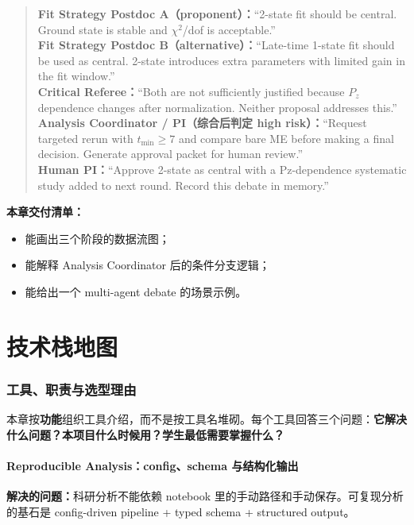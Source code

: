 \documentclass[11pt,a4paper,fontset=fandol]{ctexart}
\begin{document}
\begin{quote}
\textbf{Fit Strategy Postdoc A（proponent）：}``2-state fit should be central. Ground state is stable and $\chi^2$/dof is acceptable.''\\
\textbf{Fit Strategy Postdoc B（alternative）：}``Late-time 1-state fit should be used as central. 2-state introduces extra parameters with limited gain in the fit window.''\\
\textbf{Critical Referee：}``Both are not sufficiently justified because $P_z$ dependence changes after normalization. Neither proposal addresses this.''\\
\textbf{Analysis Coordinator / PI（综合后判定 high risk）：}``Request targeted rerun with $t_{\min}\ge 7$ and compare bare ME before making a final decision. Generate approval packet for human review.''\\
\textbf{Human PI：}``Approve 2-state as central with a Pz-dependence systematic study added to next round. Record this debate in memory.''
\end{quote}

\textbf{本章交付清单：}
\begin{itemize}
  \item 能画出三个阶段的数据流图；
  \item 能解释 Analysis Coordinator 后的条件分支逻辑；
  \item 能给出一个 multi-agent debate 的场景示例。
\end{itemize}

\newpage
\part{技术栈地图}

\section{工具、职责与选型理由}

本章按\textbf{功能}组织工具介绍，而不是按工具名堆砌。每个工具回答三个问题：\textbf{它解决什么问题？本项目什么时候用？学生最低需要掌握什么？}

\subsection{Reproducible Analysis：config、schema 与结构化输出}

\textbf{解决的问题：}科研分析不能依赖 notebook 里的手动路径和手动保存。可复现分析的基石是 config-driven pipeline + typed schema + structured output。
\end{document}
